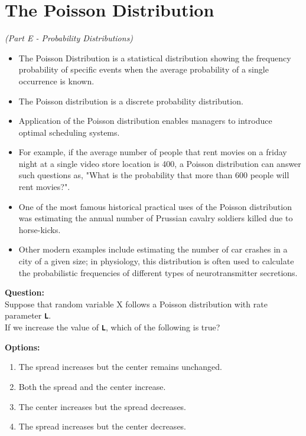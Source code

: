 \documentclass[]{article}
\begin{document}
\section*{The Poisson Distribution}
\textit{(Part E - Probability Distributions)}
\begin{itemize}
\item The Poisson Distribution is a statistical distribution showing the frequency probability of specific events when the average probability of a single occurrence is known. 

\item The Poisson distribution is a discrete probability distribution.

\item Application of the Poisson distribution enables managers to introduce optimal scheduling systems. 

\item For example, if the average number of people that rent movies on a friday night at a single video store location is 400,  a Poisson distribution can answer such questions as, "What is the probability that more than 600 people will rent movies?".



\item One of the most famous historical practical uses of the Poisson distribution was estimating the annual number of Prussian cavalry soldiers killed due to horse-kicks. 

\item Other modern examples include estimating the number of car crashes in a city of a given size; 
in physiology, this distribution is often used to calculate the probabilistic frequencies of different types of neurotransmitter secretions. 
\end{itemize}

\noindent\textbf{Question:}\\
Suppose that random variable X follows a Poisson distribution with rate parameter \texttt{\textbf{L}}. \\
If we increase the value of \texttt{\textbf{L}}, which of the following is true?


\bigskip
\noindent\textbf{Options:}
\begin{enumerate}
	\item The spread increases but the center remains unchanged.
	\item Both the spread and the center increase.
	\item The center increases but the spread decreases.
	\item The spread increases but the center decreases.
\end{enumerate}
\end{document}
